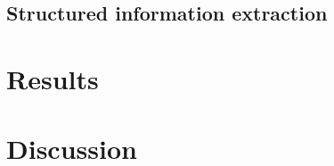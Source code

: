 \documentclass{article}
\begin{document}
\subsection{Structured information extraction}



\section{Results}



\section{Discussion}





\end{document}
